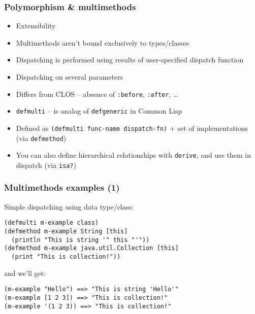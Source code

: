 \begin{frame}[fragile,t]
  \frametitle{Polymorphism \& multimethods}
  \begin{itemize}
  \item Extensibility
  \item Multimethods aren't bound exclusively to types/classes
  \item Dispatching is performed using results of user-specified dispatch function
  \item Dispatching on several parameters
  \item Differs from CLOS -- absence of \texttt{:before}, \texttt{:after}, \ldots{}
  \item \texttt{defmulti} -- is analog of \texttt{defgeneric} in Common Lisp
  \item Defined as \lstinline!(defmulti func-name dispatch-fn)! + set of implementations
    (via \texttt{defmethod})
  \item You can also define hierarchical relationships with \texttt{derive}, and use them
    in dispatch (via \texttt{isa?})
  \end{itemize}
\end{frame}

\begin{frame}[fragile,t]
  \frametitle{Multimethods examples (1)}
Simple dispatching using data type/class:
\begin{lstlisting}
(defmulti m-example class)
(defmethod m-example String [this]
  (println "This is string '" this "'"))
(defmethod m-example java.util.Collection [this]
  (print "This is collection!"))
\end{lstlisting}
and we'll get:
\begin{lstlisting}
(m-example "Hello") ==> "This is string 'Hello'"
(m-example [1 2 3]) ==> "This is collection!"
(m-example '(1 2 3)) ==> "This is collection!"
\end{lstlisting}
\end{frame}

